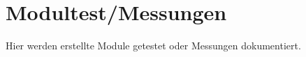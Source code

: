 

\section{Modultest/Messungen}

Hier werden erstellte Module getestet oder Messungen dokumentiert.

